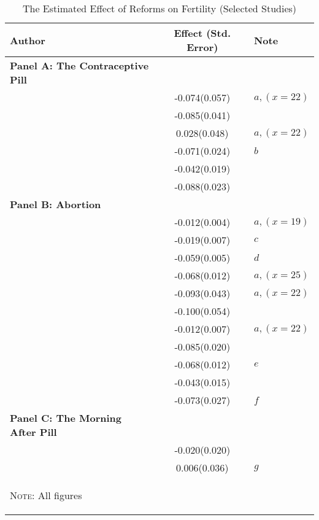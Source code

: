 \begin{table}[htpb!]
\caption{The Estimated Effect of Reforms on Fertility (Selected Studies)}
\label{TEENtab:lit}
\begin{tabular}{lcl} \toprule
Author & Effect (Std. Error) & Note \\ \midrule
\textbf{Panel A: The Contraceptive Pill} &&\\
\citet{Bailey2006}            & -0.074(0.057) & $a,(x=22)$  \\
\citet{Guldi2008}             & -0.085(0.041) &             \\
\citet{Bailey2009}            & 0.028(0.048)  & $a,(x=22)$  \\
\citet{KearnerLevine2009}     & -0.071(0.024) & $b$         \\
\citet{Bailey2012}            & -0.042(0.019) &             \\
\citet{OltmansHungerman2012}  & -0.088(0.023) &             \\
\textbf{Panel B: Abortion}&&\\
\citet{AngristEvans1996}      & -0.012(0.004) & $a,(x=19)$  \\
\citet{Levineetal1996}        & -0.019(0.007) & $c$         \\
\citet{Gruberetal1999}        & -0.059(0.005) & $d$         \\
\citet{Ananatetal2007}        & -0.068(0.012) & $a,(x=25)$  \\
\citet{Bailey2006}            & -0.093(0.043) & $a,(x=22)$  \\
\citet{Guldi2008}             & -0.100(0.054) &             \\
\citet{Bailey2009}            & -0.012(0.007) & $a,(x=22)$  \\
\citet{Ananatetal2009}        & -0.085(0.020) &             \\
\citet{PopEleches2010}        & -0.068(0.012) & $e$         \\
\citet{OltmansHungerman2012}  & -0.043(0.015) &             \\
\citet{Valente2014}           & -0.073(0.027) & $f$         \\
\textbf{Panel C: The Morning After Pill}\\
\citet{Grossetal2014}         & -0.020(0.020) &             \\
\citet{Durrance2013}          & 0.006(0.036)  & $g$         \\
\bottomrule
\multicolumn{3}{p{11.2cm}}{\begin{footnotesize}\textsc{Note:} All figures 

\end{footnotesize}}
\end{tabular}
\end{table}
